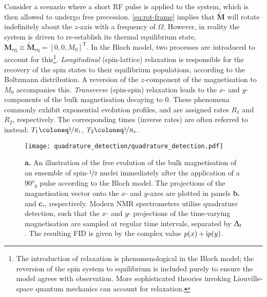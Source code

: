 Consider a scenario where a short \ac{RF} pulse is applied to the system, which
is then allowed to undergo free precession. \cref{eq:rot-frame} implies that
$\tilde{\symbf{M}}$ will rotate indefinitely about the $z$-axis with a
frequency of $\Omega$. However, in reality the system is driven to re-establish
its thermal equilibrium state, $\symbf{M}_{\text{eq}} \equiv
\tilde{\symbf{M}}_{\text{eq}} = [0, 0, M_0]^{\mathrm{T}}$. In the
Bloch model, two processes are introduced to account for this\footnote{
    The introduction of relaxation is phenomenological in the Bloch model; the
    reversion of the spin system to equilibrium is included purely to ensure
    the model agrees with observation. More sophisticated theories invoking
    Liouville-space quantum mechanics can account for
    relaxation\cite{Goldman2001,Kuprov2007}.
}. \emph{Longitudinal} (spin-lattice)
relaxation is responsible for the recovery of the spin states to their
equilibrium populations, according to the Boltzmann distribution. A reversion
of the $z$-component of the magnetisation to $M_0$ accompanies this.
\emph{Transverse} (spin-spin) relaxation leads to the $x$- and $y$-components
of the bulk magnetisation decaying to $0$. These phenomena commonly exhibit
exponential evolution profiles, and are assigned rates $R_1$ and $R_2$,
respectively. The corresponding times (inverse rates) are often referred to
instead:
$T_1 \coloneq \nicefrac{1}{R_1}$,
$T_2 \coloneq \nicefrac{1}{R_2}$.
\begin{figure}
    \centering
    \texttt{[image: quadrature\_detection/quadrature\_detection.pdf]}
    \caption[
        An illustration of the free evolution of the bulk
        magnetisation of an ensemble of spin-$\nicefrac{1}{2}$ nuclei
        according to the Bloch model.
    ]{
        \textbf{a.} An illustration of the free evolution of the bulk
        magnetisation of an ensemble of spin-$\nicefrac{1}{2}$ nuclei
        immediately after the application of a $\ang{90}_y$ pulse according to
        the Bloch model.
        The projections of the magnetisation vector onto the
        $x$- and  $y$-axes are plotted in panels \textbf{b.} and \textbf{c.},
        respectively. Modern \acs{NMR} spectrometers utilise quadrature
        detection, such that the $x$- and  $y$- projections of the time-varying
        magnetisation are sampled at regular time intervals, separated by
        $\Updelta_t$.  The resulting \acs{FID} is given by the complex value $p(x) +
        \mathrm{i} p(y)$.
    }\label{fig:quadrature}
\end{figure}


